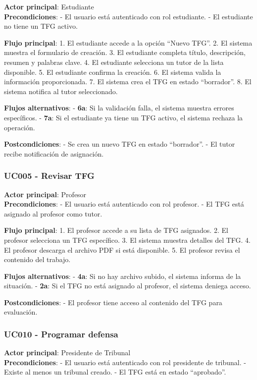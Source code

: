 \documentclass[12pt,a4paper,oneside]{report}
\begin{document}
\textbf{Actor principal}: Estudiante\\
\textbf{Precondiciones}: - El usuario está autenticado con rol
estudiante. - El estudiante no tiene un TFG activo.

\textbf{Flujo principal}: 1. El estudiante accede a la opción ``Nuevo
TFG''. 2. El sistema muestra el formulario de creación. 3. El estudiante
completa título, descripción, resumen y palabras clave. 4. El estudiante
selecciona un tutor de la lista disponible. 5. El estudiante confirma la
creación. 6. El sistema valida la información proporcionada. 7. El
sistema crea el TFG en estado ``borrador''. 8. El sistema notifica al
tutor seleccionado.

\textbf{Flujos alternativos}: - \textbf{6a}: Si la validación falla, el
sistema muestra errores específicos. - \textbf{7a}: Si el estudiante ya
tiene un TFG activo, el sistema rechaza la operación.

\textbf{Postcondiciones}: - Se crea un nuevo TFG en estado ``borrador''.
- El tutor recibe notificación de asignación.

\subsubsection{UC005 - Revisar TFG}\label{uc005---revisar-tfg}

\textbf{Actor principal}: Profesor\\
\textbf{Precondiciones}: - El usuario está autenticado con rol profesor.
- El TFG está asignado al profesor como tutor.

\textbf{Flujo principal}: 1. El profesor accede a su lista de TFG
asignados. 2. El profesor selecciona un TFG específico. 3. El sistema
muestra detalles del TFG. 4. El profesor descarga el archivo PDF si está
disponible. 5. El profesor revisa el contenido del trabajo.

\textbf{Flujos alternativos}: - \textbf{4a}: Si no hay archivo subido,
el sistema informa de la situación. - \textbf{2a}: Si el TFG no está
asignado al profesor, el sistema deniega acceso.

\textbf{Postcondiciones}: - El profesor tiene acceso al contenido del
TFG para evaluación.

\subsubsection{UC010 - Programar
defensa}\label{uc010---programar-defensa}

\textbf{Actor principal}: Presidente de Tribunal\\
\textbf{Precondiciones}: - El usuario está autenticado con rol
presidente de tribunal. - Existe al menos un tribunal creado. - El TFG
está en estado ``aprobado''.
\end{document}

